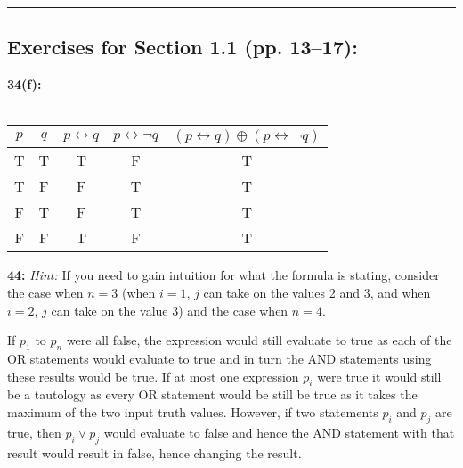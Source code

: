 \documentclass[12pt]{article}  %
\newcommand{\NOT}{\neg}
\newcommand{\OR}{\vee}
\newcommand{\XOR}{\oplus}
\newcommand{\IFF}{\leftrightarrow}
\begin{document}
\noindent

\rule{6in}{.1pt}       %


\subsection*{Exercises for Section 1.1 (pp. 13--17):}     

\noindent
{\bf 34(f):}\\\\
\indent
\begin{tabular}{|c|c|c|c|c|}  %
\hline                  %
$p$ & $q$ & $p \IFF q$ & $p \IFF \NOT q$ & $(p \IFF q) \XOR (p \IFF \NOT q)$\\       %
\hline
\hline
T & T & T & F & T\\
\hline
T & F & F & T & T\\
\hline
F & T & F & T & T\\
\hline
F & F & T & F & T\\
\hline
\end{tabular}


\noindent
{\bf 44:}  {\em Hint:}  If you need to gain intuition for what the
formula is stating, consider the case when $n = 3$ (when $i = 1$,
$j$ can take on the values 2 and 3, and when $i = 2$, $j$ can take
on the value 3) and the case when $n = 4$.

If $p_{1}$ to $p_{n}$ were all false, the expression would still evaluate to true as each of the OR statements would evaluate to true and in turn the AND statements using these results would be true. If at most one expression $p_{i}$ were true it would still be a tautology as every OR statement would be still be true as it takes the maximum of the two input truth values. However, if two statements $p_{i}$ and $p_{j}$ are true, then $p_{i} \OR p_{j}$ would evaluate to false and hence the AND statement with that result would result in false, hence changing the result.
\end{document}
